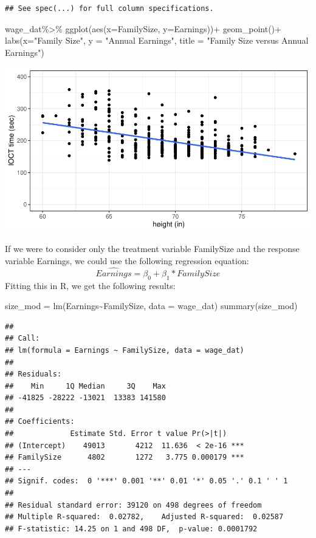 \documentclass[
]{book}
\newenvironment{Shaded}{\begin{snugshade}}{\end{snugshade}}
\newcommand{\AttributeTok}[1]{\textcolor[rgb]{0.77,0.63,0.00}{#1}}
\newcommand{\FunctionTok}[1]{\textcolor[rgb]{0.00,0.00,0.00}{#1}}
\newcommand{\NormalTok}[1]{#1}
\newcommand{\OtherTok}[1]{\textcolor[rgb]{0.56,0.35,0.01}{#1}}
\newcommand{\SpecialCharTok}[1]{\textcolor[rgb]{0.00,0.00,0.00}{#1}}
\newcommand{\StringTok}[1]{\textcolor[rgb]{0.31,0.60,0.02}{#1}}
\begin{document}
\begin{verbatim}
## See spec(...) for full column specifications.
\end{verbatim}

\begin{Shaded}
\begin{Highlighting}[]
\NormalTok{wage\_dat}\SpecialCharTok{\%\textgreater{}\%}
  \FunctionTok{ggplot}\NormalTok{(}\FunctionTok{aes}\NormalTok{(}\AttributeTok{x=}\NormalTok{FamilySize, }\AttributeTok{y=}\NormalTok{Earnings))}\SpecialCharTok{+}
  \FunctionTok{geom\_point}\NormalTok{()}\SpecialCharTok{+}
  \FunctionTok{labs}\NormalTok{(}\AttributeTok{x=}\StringTok{"Family Size"}\NormalTok{, }\AttributeTok{y =} \StringTok{"Annual Earnings"}\NormalTok{, }\AttributeTok{title =} \StringTok{"Family Size versus Annual Earnings"}\NormalTok{)}
\end{Highlighting}
\end{Shaded}

\includegraphics{MA206supplement_files/figure-latex/unnamed-chunk-16-1.pdf}

If we were to consider only the treatment variable FamilySize and the response variable Earnings, we could use the following regression equation:
\[\widehat{Earnings} = \beta_0+\beta_1*FamilySize\]
Fitting this in R, we get the following results:

\begin{Shaded}
\begin{Highlighting}[]
\NormalTok{size\_mod }\OtherTok{=} \FunctionTok{lm}\NormalTok{(Earnings}\SpecialCharTok{\textasciitilde{}}\NormalTok{FamilySize, }\AttributeTok{data =}\NormalTok{ wage\_dat)}
\FunctionTok{summary}\NormalTok{(size\_mod)}
\end{Highlighting}
\end{Shaded}

\begin{verbatim}
## 
## Call:
## lm(formula = Earnings ~ FamilySize, data = wage_dat)
## 
## Residuals:
##    Min     1Q Median     3Q    Max 
## -41825 -28222 -13021  13383 141580 
## 
## Coefficients:
##             Estimate Std. Error t value Pr(>|t|)    
## (Intercept)    49013       4212  11.636  < 2e-16 ***
## FamilySize      4802       1272   3.775 0.000179 ***
## ---
## Signif. codes:  0 '***' 0.001 '**' 0.01 '*' 0.05 '.' 0.1 ' ' 1
## 
## Residual standard error: 39120 on 498 degrees of freedom
## Multiple R-squared:  0.02782,    Adjusted R-squared:  0.02587 
## F-statistic: 14.25 on 1 and 498 DF,  p-value: 0.0001792
\end{verbatim}
\end{document}

